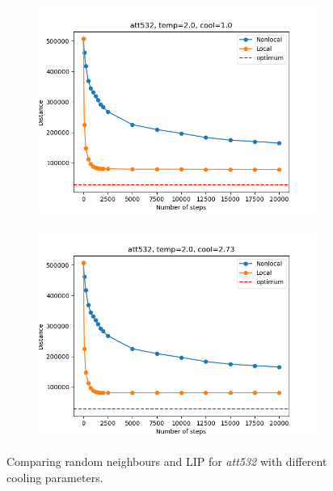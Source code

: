 \begin{figure}[!htb]
	\centering
	\begin{subfigure}{0.45\textwidth}
		\includegraphics[width=\textwidth]{img/att532_temp=2.0_cool=1.0}
	\end{subfigure}
	\begin{subfigure}{0.45\textwidth}
		\includegraphics[width=\textwidth]{img/att532_temp=2.0_cool=2.73}
	\end{subfigure}
	\caption{Comparing random neighbours and LIP for \textit{att532} with different cooling parameters.}
	\label{fig:att532_comp}
\end{figure}

